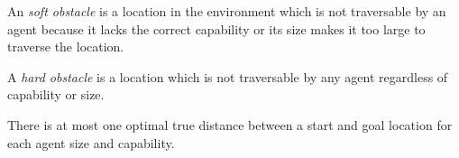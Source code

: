 \begin{definition}
An \emph{soft obstacle} is a location in the environment which is not traversable by an agent because it lacks the correct capability or its size makes it too large to traverse the location. 
\end{definition}

\begin{definition}
A \emph{hard obstacle} is a location which is not traversable by any agent regardless of capability or size.
\end{definition}

\begin{definition}
There is at most one optimal true distance between a start and goal location for each agent size and capability.
\end{definition}


